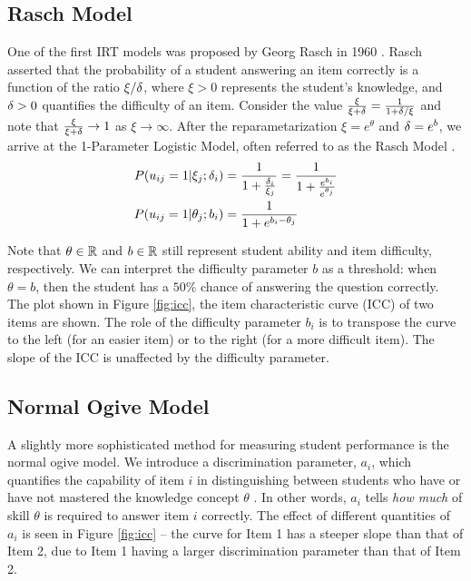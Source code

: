 \subsection{Rasch Model}
One of the first IRT models was proposed by Georg Rasch in 1960 \cite{rasch1960}. Rasch asserted that the probability of a student answering an item correctly is a function of the ratio $\xi / \delta$, where $\xi > 0$ represents the student's knowledge, and $\delta > 0$ quantifies the difficulty of an item. Consider the value $\frac{\xi}{\xi + \delta} = \frac{1}{1 + \delta / \xi}$ and note that $\frac{\xi}{\xi + \delta} \to 1$ as $\xi \to \infty$. After the reparametarization $\xi = e^{\theta}$ and $\delta = e^{b}$, we arrive at the 1-Parameter Logistic Model, often referred to as the Rasch Model \cite{thissen}.
\begin{equation}
  \begin{split}
    P(u_{ij} = 1 | \xi_j; \delta_i) &= \frac{1}{1 + \frac{\delta_i}{\xi_j}} = \frac{1}{1 + \frac{e^{b_i}}{e^{\theta_j}}} \\
  P(u_{ij} = 1 | \theta_j; b_i) &= \frac{1}{1 + e^{b_i - \theta_j}} 
  \end{split}
  \label{eq:rasch}
\end{equation}

Note that $\theta \in \mathbb{R}$ and $b \in \mathbb{R}$ still represent student ability and item difficulty, respectively. We can interpret the difficulty parameter $b$ as a threshold: when $\theta = b$, then the student has a $50\%$ chance of answering the question correctly. The plot shown in Figure \ref{fig:icc}, the item characteristic curve (ICC) of two items are shown. The role of the difficulty parameter $b_i$ is to transpose the curve to the left (for an easier item) or to the right (for a more difficult item). The slope of the ICC is unaffected by the difficulty parameter.


\subsection{Normal Ogive Model}\label{sec:ogive}
A slightly more sophisticated method for measuring student performance is the normal ogive model. We introduce a discrimination parameter, $a_i$, which quantifies the capability of item $i$ in distinguishing between students who have or have not mastered the knowledge concept $\theta$ \cite{thissen}. In other words, $a_i$ tells \textit{how much} of skill $\theta$ is required to answer item $i$ correctly. The effect of different quantities of $a_i$ is seen in Figure \ref{fig:icc} -- the curve for Item 1 has a steeper slope than that of Item 2, due to Item 1 having a larger discrimination parameter than that of Item 2.

